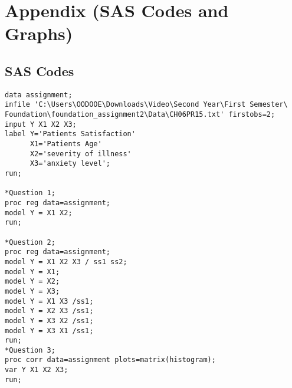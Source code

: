 \documentclass[a4paper,9pt]{article}\usepackage[]{graphicx}\usepackage[]{color}
\begin{document}
\section*{Appendix (SAS Codes and Graphs)}
\subsection*{SAS Codes}
\begin{verbatim}
data assignment;
infile 'C:\Users\OODOOE\Downloads\Video\Second Year\First Semester\
Foundation\foundation_assignment2\Data\CH06PR15.txt' firstobs=2;
input Y X1 X2 X3;
label Y='Patients Satisfaction'
	  X1='Patients Age'
	  X2='severity of illness'
	  X3='anxiety level';
run;

*Question 1;
proc reg data=assignment;
model Y = X1 X2;
run;

*Question 2;
proc reg data=assignment;
model Y = X1 X2 X3 / ss1 ss2;
model Y = X1;
model Y = X2;
model Y = X3;
model Y = X1 X3 /ss1;
model Y = X2 X3 /ss1;
model Y = X3 X2 /ss1;
model Y = X3 X1 /ss1;
run;
*Question 3;
proc corr data=assignment plots=matrix(histogram);
var Y X1 X2 X3;
run;
\end{verbatim}
\end{document}
